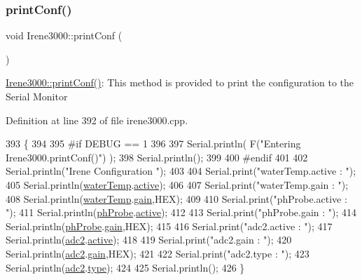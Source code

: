 \subsubsection{\texorpdfstring{print\+Conf()}{printConf()}}
{\footnotesize\ttfamily void Irene3000\+::print\+Conf (\begin{DoxyParamCaption}{ }\end{DoxyParamCaption})}

\hyperlink{class_irene3000_a7bc2414100b5e19eacc6630fa34b2654}{Irene3000\+::print\+Conf()}\+: This method is provided to print the configuration to the Serial Monitor 

Definition at line 392 of file irene3000.\+cpp.


\begin{DoxyCode}
393 \{
394 
395 \textcolor{preprocessor}{#if DEBUG == 1 }
396 
397     Serial.println( F(\textcolor{stringliteral}{"Entering Irene3000.printConf()"}) );
398     Serial.println();
399 
400 \textcolor{preprocessor}{#endif }
401 
402     Serial.println(\textcolor{stringliteral}{"Irene Configuration "});
403 
404     Serial.print(\textcolor{stringliteral}{"waterTemp.active : "});
405     Serial.println(\hyperlink{class_irene3000_af05612c78c758ce9db316c75ad937130}{waterTemp}.\hyperlink{struct_irene3000_1_1state_a879828ace7e7a7bc91ff703bfee36599}{active});
406 
407     Serial.print(\textcolor{stringliteral}{"waterTemp.gain : "});
408     Serial.println(\hyperlink{class_irene3000_af05612c78c758ce9db316c75ad937130}{waterTemp}.\hyperlink{struct_irene3000_1_1state_a1ecf69d38cb31ecaf6b3602a3f3e93cb}{gain},HEX);    
409 
410     Serial.print(\textcolor{stringliteral}{"phProbe.active : "});
411     Serial.println(\hyperlink{class_irene3000_a997a4ee466fa1d5416e07e444965dc9e}{phProbe}.\hyperlink{struct_irene3000_1_1state_a879828ace7e7a7bc91ff703bfee36599}{active});
412 
413     Serial.print(\textcolor{stringliteral}{"phProbe.gain : "});
414     Serial.println(\hyperlink{class_irene3000_a997a4ee466fa1d5416e07e444965dc9e}{phProbe}.\hyperlink{struct_irene3000_1_1state_a1ecf69d38cb31ecaf6b3602a3f3e93cb}{gain},HEX);
415     
416     Serial.print(\textcolor{stringliteral}{"adc2.active : "});
417     Serial.println(\hyperlink{class_irene3000_aae3a95a1c83c766cd2f299ce471c337e}{adc2}.\hyperlink{struct_irene3000_1_1state_a879828ace7e7a7bc91ff703bfee36599}{active});
418 
419     Serial.print(\textcolor{stringliteral}{"adc2.gain : "});
420     Serial.println(\hyperlink{class_irene3000_aae3a95a1c83c766cd2f299ce471c337e}{adc2}.\hyperlink{struct_irene3000_1_1state_a1ecf69d38cb31ecaf6b3602a3f3e93cb}{gain},HEX);
421 
422     Serial.print(\textcolor{stringliteral}{"adc2.type : "});
423     Serial.println(\hyperlink{class_irene3000_aae3a95a1c83c766cd2f299ce471c337e}{adc2}.\hyperlink{struct_irene3000_1_1state_a9897a7e02727db6351d44006eec73799}{type});
424 
425     Serial.println();
426 \}
\end{DoxyCode}
